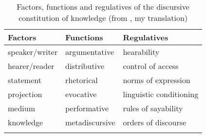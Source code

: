 \begin{table}
\begin{tabularx}{\textwidth}{XXX}
\lsptoprule
\textbf{Factors} & \textbf{Functions} & \textbf{Regulatives}\\
\midrule
speaker/writer & argumentative & hearability\\
hearer/reader & distributive & control of access\\
statement & rhetorical & norms of expression\\
projection & evocative & linguistic conditioning\\
medium & performative & rules of sayability\\
knowledge & metadiscursive & orders of discourse\\
\lspbottomrule
\end{tabularx}
\caption{
Factors, functions and regulatives of the discursive constitution of knowledge (from \citealt[63]{Spitzmuller2011}, my translation)
}
\label{tab:2:5}
\end{table}

